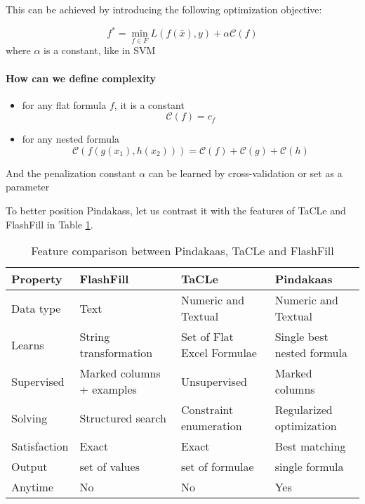 This can be achieved by introducing the following optimization
objective:

  \begin{equation*}
    f^* = \min_{f \in F}{L(f(\bar x),y) + \alpha \mathcal{C}(f)}
  \end{equation*}
  where $\alpha$ is a constant, like in SVM

\paragraph{How can we define complexity}
  \begin{itemize}
     \item for any flat formula $f$, it is a constant
       \begin{equation*}
         \mathcal{C}(f) = c_f 
       \end{equation*}
     \item for any nested formula 
       \begin{equation*}
       \mathcal{C}(f(g(x_1),h(x_2))) = \mathcal{C}(f) + \mathcal{C}(g) + \mathcal{C}(h)
       \end{equation*}
  \end{itemize}
  And the penalization constant $\alpha$ can be learned by cross-validation or set as a parameter

To better position Pindakass, let us contrast it with the features of
TaCLe and FlashFill in Table \ref{tab:pindakaas_features}.
\begin{table}
  \begin{tabularx}{\textwidth}{l | X | X | X }
    \textbf{Property} & \textbf{FlashFill} & \textbf{TaCLe} &
    \textbf{Pindakaas} \\ \hline
    Data type & Text & Numeric and Textual &  Numeric and
    Textual\\\hline
    Learns & String transformation & Set of Flat Excel Formulae
    & Single best nested formula\\\hline
    Supervised & Marked columns + examples & Unsupervised &
    Marked columns \\\hline
    Solving & Structured search & Constraint enumeration &
    Regularized optimization \\\hline
    Satisfaction & Exact & Exact &  Best
    matching\\\hline
    Output & set of values & set of formulae & single
    formula\\ \hline
    Anytime & No & No & Yes
  \end{tabularx}
  \caption{Feature comparison between Pindakaas, TaCLe and FlashFill}
  \label{tab:pindakaas_features}
\end{table}


